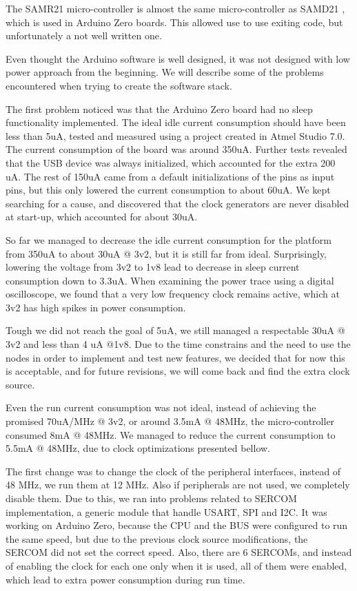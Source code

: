 The SAMR21 micro-controller is almost the same micro-controller as SAMD21 \cite{samd21}, which is used in Arduino
Zero boards. This allowed use to use exiting code, but unfortunately a not well
written one.

Even thought the Arduino software is well designed, it was not designed with low power approach
from the beginning. We will describe some of the problems encountered when trying to create the software stack.

The first problem noticed was that the Arduino Zero board had no sleep functionality implemented.
The ideal idle current consumption should have been less than 5uA, tested and measured using a
project created in Atmel Studio 7.0. The current consumption of the board was around 350uA. Further
tests revealed that the USB device was always initialized, which accounted for the extra 200
uA. The rest of 150uA came from a default initializations of the pins as input pins, but this only
lowered the current consumption to about 60uA. We kept searching for a cause, and discovered that
the clock generators are never disabled at start-up, which accounted for about 30uA.

So far we managed to decrease the idle current consumption for the platform from 350uA to about
30uA @ 3v2, but it is still far from ideal. Surprisingly, lowering the voltage from 3v2 to 1v8 lead
to  decrease in sleep current consumption down to 3.3uA. When examining the power trace using a digital oscilloscope, we found
that a very low frequency clock remains active, which at 3v2 has high spikes in power consumption.

Tough we did not reach the goal of 5uA, we still managed a respectable 30uA @ 3v2 and less than 4 uA @1v8.
Due to the time constrains and the need to use the nodes in order to implement and test new
features, we decided that for now this is acceptable, and for future revisions, we will come back
and find the extra clock source.

Even the run current consumption was not ideal, instead of achieving the promised 70uA/MHz @ 3v2,
or around 3.5mA @ 48MHz, the micro-controller consumed 8mA @ 48MHz. We managed to reduce the current consumption to 5.5mA @ 48MHz, due to
clock optimizations presented bellow.

The first change was to change the clock of the peripheral interfaces, instead of 48 MHz, we run them at 12 MHz.
Also if peripherals are not used, we completely disable them. Due to this, we ran into problems
related to SERCOM implementation, a generic module that handle USART, SPI and I2C. It was working
on Arduino Zero, because the CPU and the BUS were configured to run the same speed, but due to the
previous clock source modifications, the SERCOM did not set the correct speed. Also, there are 6
SERCOMs, and instead of enabling the clock for each one only when it is used, all of them were
enabled, which lead to extra power consumption during run time.

